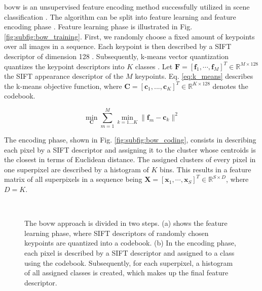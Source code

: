 \gls{bovw} is an unsupervised feature encoding method successfully utilized in scene classification \cite{zhang15}.
The algorithm can be split into feature learning and feature encoding phase \cite{cheriyadat14}.
Feature learning phase is illustrated in Fig. \ref{fig:subfig:bow_training}.
First, we randomly choose a fixed amount of keypoints over all images in a sequence.
Each keypoint is then described by a SIFT descriptor of dimension 128 \cite{lowe04}.
Subsequently, k-means vector quantization quantizes the keypoint descriptors into $K$ classes \cite{lloyd1982}.
Let $\boldsymbol{F} = [\boldsymbol{f}_1,\cdots,\boldsymbol{f}_M]^T \in \mathbb{R}^{M \times 128}$ the SIFT appearance descriptor of the $M$ keypoints.
Eq. \ref{eq:k_means} describes the k-means objective function, where $\boldsymbol{C} = [\boldsymbol{c}_1,...,\boldsymbol{c}_K]^T \in \mathbb{R}^{K \times 128}$ denotes the codebook.

\begin{equation}
   \min_{\boldsymbol{C}} \sum_{m=1}^M \min_{k=1...K} \|\boldsymbol{f}_m - \boldsymbol{c}_k\|^2
   \label{eq:k_means} 
\end{equation}
\vspace{6pt}

The encoding phase, shown in Fig. \ref{fig:subfig:bow_coding}, consists in describing each pixel by a SIFT descriptor and assigning it to the cluster whose centroids is the closest in terms of Euclidean distance.
The assigned clusters of every pixel in one superpixel are described by a histogram of $K$ bins.
This results in a feature matrix of all superpixels in a sequence being $\boldsymbol{X} = [\boldsymbol{x}_1,\cdots,\boldsymbol{x}_S]^T \in \mathbb{R}^{S \times D}$, where $D = K$.

\begin{figure}[htbp]
  \centering
  \\
  \caption[BoVW illustration]{The \gls{bovw} approach is divided in two steps.
    (a) shows the feature learning phase, where SIFT descriptors of randomly chosen keypoints are quantized into a codebook.
    (b) In the encoding phase, each pixel is described by a SIFT descriptor and assigned to a class using the codebook.
    Subsequently, for each superpixel, a histogram of all assigned classes is created, which makes up the final feature descriptor.}
  \label{fig:BoVW_approch}  
\end{figure}

